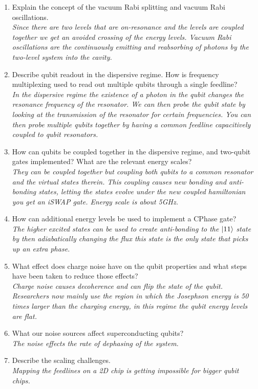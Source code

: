 \documentclass[a4paper]{scrartcl}
\newcommand{\qa}[2]{#1\\ \textit{#2}}
\begin{document}
\begin{enumerate}
  \item \qa{Explain the concept of the vacuum Rabi splitting and vacuum Rabi oscillations. }{Since there are two levels that are on-resonance and the levels are coupled together we get an avoided crossing of the energy levels. Vacuum Rabi oscillations are the continuously emitting and reabsorbing of photons by the two-level system into the cavity.}
  \item \qa{Describe qubit readout in the dispersive regime. How is frequency multiplexing used to read out multiple qubits through a single feedline?}{In the dispersive regime the existence of a photon in the qubit changes the resonance frequency of the resonator. We can then probe the qubit state by looking at the transmission of the resonator for certain frequencies. You can then probe multiple qubits together by having a common feedline capacitively coupled to qubit resonators.}
  \item \qa{How can qubits be coupled together in the dispersive regime, and two-qubit gates implemented? What are the relevant energy scales?  }{They can be coupled together but coupling both qubits to a common resonator and the virtual states therein. This coupling causes new bonding and anti-bonding states, letting the states evolve under the new coupled hamiltonian you get an iSWAP gate. Energy scale is about 5GHz.}
  \item \qa{How can additional energy levels be used to implement a CPhase gate?}{The higher excited states can be used to create anti-bonding to the } $\ket{11}$ \textit{ state by then adiabatically changing the flux this state is the only state that picks up an extra phase.}
  \item \qa{What effect does charge noise have on the qubit properties and what steps have been taken to reduce those effects?}{Charge noise causes decoherence and can flip the state of the qubit. Researchers now mainly use the region in which the Josephson energy is 50 times larger than the charging energy, in this regime the qubit energy levels are flat.}
  \item \qa{What our noise sources affect superconducting qubits?}{The noise effects the rate of dephasing of the system.}
  \item \qa{Describe the scaling challenges.}{Mapping the feedlines on a 2D chip is getting impossible for bigger qubit chips.}
\end{enumerate}
\end{document}
